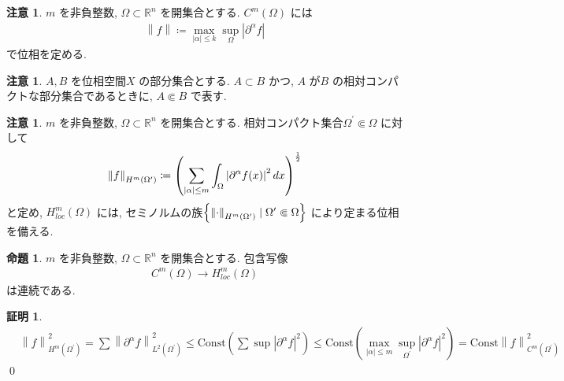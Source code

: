 \documentclass[10pt, fleqn, label-section=none]{bxjsarticle}
\title{}
\date{}
\author{}
\theoremstyle{definition}
\newtheorem{prop}[dfn]{命題}
\newtheorem*{pf*}{証明}
\newtheorem{remark}[dfn]{注意}
\newcommand{\paren}[1]{\mleft( #1\mright )}
\newcommand{\cbra}[1]{\mleft\{#1\mright\}}
\newcommand{\abs}[1]{\left|#1\right|}
\newcommand{\norm}[1]{\left\|#1\right\|}
\newcommand{\Const}{\textrm{Const}}
\renewcommand{\;}{\, ; \,}
\begin{document}
\maketitle


\section{}

\begin{remark} $m$ を非負整数, $\Omega \subset \mathbb R^n$ を開集合とする. 
$C^m (\Omega)$ には
\begin{align*} \norm{f} \coloneqq \max_{\abs \alpha \leq k} \sup_{\Omega} \abs{\partial^\alpha f} \end{align*}
で位相を定める. 
\end{remark}

\begin{remark}
$A,B$ を位相空間$X$ の部分集合とする. $A \subset B$ かつ, $A$ が$B$ の相対コンパクトな部分集合であるときに, $A \Subset B$ で表す. 
\end{remark}


\begin{remark} $m$ を非負整数, $\Omega \subset \mathbb R^n$ を開集合とする. 
相対コンパクト集合$\Omega^\prime \Subset \Omega$ に対して
\begin{align*} \norm{f}_{H^m(\Omega^\prime)} \coloneqq \paren{\sum_{\abs{\alpha} \leq m} \int_{\Omega} \abs{\partial ^\alpha f(x)} ^2 dx}^{\frac{1}{2}}\end{align*}
と定め, $H^m_{loc} (\Omega)$ には, セミノルムの族$\cbra{\norm{\cdot}_{H^m(\Omega^\prime)} \mid \Omega^\prime \Subset \Omega}$ により定まる位相を備える.
\end{remark}


\begin{prop} $m$ を非負整数, $\Omega \subset \mathbb R^n$ を開集合とする. 包含写像
\begin{align*} C^m (\Omega) \rightarrow H^m_{loc} (\Omega) \end{align*}
は連続である. 
\end{prop}
\begin{pf*}
\begin{align*} &\norm{f}_{H^m(\Omega^\prime)}^2 = \sum \norm{\partial^\alpha f}_{L^2(\Omega^\prime)}^2 \leq \Const ( \sum \sup \abs{\partial ^\alpha f}^2 ) \leq \Const ( \max_{\abs{\alpha } \leq m} \sup_{\Omega^\prime} \abs{\partial^\alpha f}^2 ) = \Const \norm{f}^2_{C^m (\Omega^\prime)}\end{align*}
\qed
\end{pf*}
\end{document}
